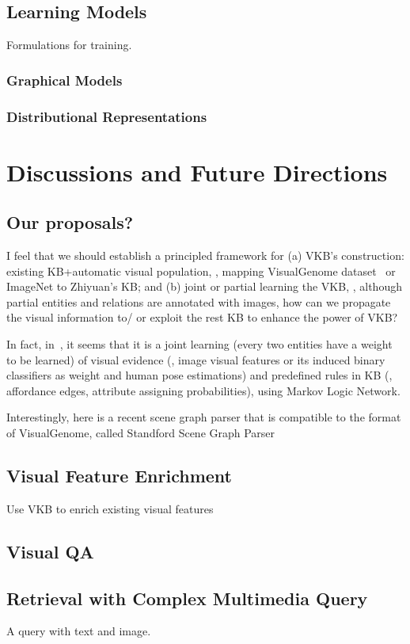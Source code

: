 \subsection{Learning Models}
Formulations for training.
\subsubsection{Graphical Models}
\subsubsection{Distributional Representations}


\section{Discussions and Future Directions}\label{sec:6}
\subsection{Our proposals?}
I feel that we should establish a principled framework for (a) VKB's construction: existing KB+automatic visual population, \eg, mapping VisualGenome dataset~\cite{krishna2016visual} or ImageNet to Zhiyuan's KB; and (b) joint or partial learning the VKB, \eg, although partial entities and relations are annotated with images, how can we propagate the visual information to/ or exploit the rest KB to enhance the power of VKB? 

In fact, in~\cite{zhu2014reasoning}, it seems that it is a joint learning (every two entities have a weight to be learned) of visual evidence (\eg, image visual features or its induced binary classifiers as weight and human pose estimations) and predefined rules in KB (\eg, affordance edges, attribute assigning probabilities), using Markov Logic Network.

Interestingly, here is a recent scene graph parser that is compatible to the format of VisualGenome, called Standford Scene Graph Parser~\cite{schuster2015generating}

\subsection{Visual Feature Enrichment}
Use VKB to enrich existing visual features
\subsection{Visual QA}
\subsection{Retrieval with Complex Multimedia Query} A query with text and image.
